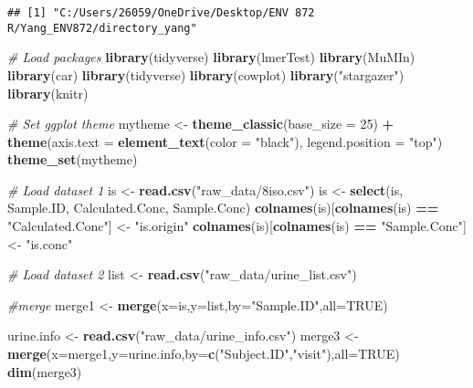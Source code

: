 \documentclass[12pt,]{article}
\newenvironment{Shaded}{\begin{snugshade}}{\end{snugshade}}
\newcommand{\CommentTok}[1]{\textcolor[rgb]{0.56,0.35,0.01}{\textit{#1}}}
\newcommand{\DataTypeTok}[1]{\textcolor[rgb]{0.13,0.29,0.53}{#1}}
\newcommand{\DecValTok}[1]{\textcolor[rgb]{0.00,0.00,0.81}{#1}}
\newcommand{\KeywordTok}[1]{\textcolor[rgb]{0.13,0.29,0.53}{\textbf{#1}}}
\newcommand{\NormalTok}[1]{#1}
\newcommand{\OperatorTok}[1]{\textcolor[rgb]{0.81,0.36,0.00}{\textbf{#1}}}
\newcommand{\OtherTok}[1]{\textcolor[rgb]{0.56,0.35,0.01}{#1}}
\newcommand{\StringTok}[1]{\textcolor[rgb]{0.31,0.60,0.02}{#1}}
\begin{document}
\begin{verbatim}
## [1] "C:/Users/26059/OneDrive/Desktop/ENV 872 R/Yang_ENV872/directory_yang"
\end{verbatim}

\begin{Shaded}
\begin{Highlighting}[]
\CommentTok{# Load packages}
\KeywordTok{library}\NormalTok{(tidyverse)}
\KeywordTok{library}\NormalTok{(lmerTest)}
\KeywordTok{library}\NormalTok{(MuMIn)}
\KeywordTok{library}\NormalTok{(car)}
\KeywordTok{library}\NormalTok{(tidyverse)}
\KeywordTok{library}\NormalTok{(cowplot)}
\KeywordTok{library}\NormalTok{(}\StringTok{"stargazer"}\NormalTok{)}
\KeywordTok{library}\NormalTok{(knitr)}
\end{Highlighting}
\end{Shaded}

\begin{Shaded}
\begin{Highlighting}[]
\CommentTok{# Set ggplot theme}
\NormalTok{mytheme <-}\StringTok{ }\KeywordTok{theme_classic}\NormalTok{(}\DataTypeTok{base_size =} \DecValTok{25}\NormalTok{) }\OperatorTok{+}
\StringTok{  }\KeywordTok{theme}\NormalTok{(}\DataTypeTok{axis.text =} \KeywordTok{element_text}\NormalTok{(}\DataTypeTok{color =} \StringTok{"black"}\NormalTok{), }
        \DataTypeTok{legend.position =} \StringTok{"top"}\NormalTok{)}
\KeywordTok{theme_set}\NormalTok{(mytheme)}

\CommentTok{# Load dataset 1}
\NormalTok{is <-}\StringTok{ }\KeywordTok{read.csv}\NormalTok{(}\StringTok{"raw_data/8iso.csv"}\NormalTok{)}
\NormalTok{is <-}\StringTok{ }\KeywordTok{select}\NormalTok{(is, Sample.ID, Calculated.Conc, Sample.Conc)}
\KeywordTok{colnames}\NormalTok{(is)[}\KeywordTok{colnames}\NormalTok{(is) }\OperatorTok{==}\StringTok{ "Calculated.Conc"}\NormalTok{] <-}\StringTok{ "is.origin"}
\KeywordTok{colnames}\NormalTok{(is)[}\KeywordTok{colnames}\NormalTok{(is) }\OperatorTok{==}\StringTok{ "Sample.Conc"}\NormalTok{] <-}\StringTok{ "is.conc"}

\CommentTok{# Load dataset 2}
\NormalTok{list <-}\StringTok{ }\KeywordTok{read.csv}\NormalTok{(}\StringTok{"raw_data/urine_list.csv"}\NormalTok{)}

\CommentTok{#merge}
\NormalTok{merge1 <-}\StringTok{ }\KeywordTok{merge}\NormalTok{(}\DataTypeTok{x=}\NormalTok{is,}\DataTypeTok{y=}\NormalTok{list,}\DataTypeTok{by=}\StringTok{"Sample.ID"}\NormalTok{,}\DataTypeTok{all=}\OtherTok{TRUE}\NormalTok{)}

\NormalTok{urine.info <-}\StringTok{ }\KeywordTok{read.csv}\NormalTok{(}\StringTok{"raw_data/urine_info.csv"}\NormalTok{)}
\NormalTok{merge3 <-}\StringTok{ }\KeywordTok{merge}\NormalTok{(}\DataTypeTok{x=}\NormalTok{merge1,}\DataTypeTok{y=}\NormalTok{urine.info,}\DataTypeTok{by=}\KeywordTok{c}\NormalTok{(}\StringTok{"Subject.ID"}\NormalTok{,}\StringTok{"visit"}\NormalTok{),}\DataTypeTok{all=}\OtherTok{TRUE}\NormalTok{)}
\KeywordTok{dim}\NormalTok{(merge3)}
\end{Highlighting}
\end{Shaded}
\end{document}
